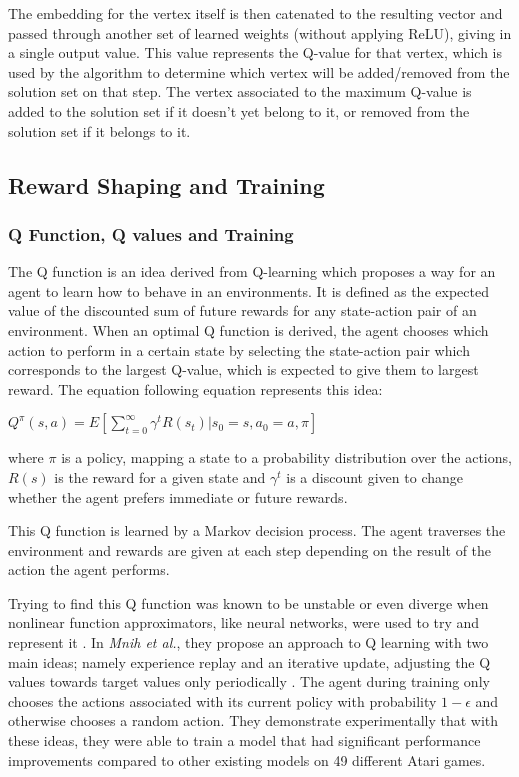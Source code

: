 \documentclass{article}
\begin{document}
The embedding for the vertex itself is then catenated to the resulting vector and passed through another set of learned weights (without applying ReLU), giving in a single output value. This value represents the Q-value for that vertex, which is used by the algorithm to determine which vertex will be added/removed from the solution set on that step. The vertex associated to the maximum Q-value is added to the solution set if it doesn't yet belong to it, or removed from the solution set if it belongs to it.

\subsection{Reward Shaping and Training}

\subsubsection{Q Function, Q values and Training}

The Q function is an idea derived from Q-learning \cite{qlearning} which proposes a way for an agent to learn how to behave in an environments. It is defined as the expected value of the discounted sum of future rewards for any state-action pair of an environment. When an optimal Q function is derived, the agent chooses which action to perform in a certain state by selecting the state-action pair which corresponds to the largest Q-value, which is expected to give them to largest reward. The equation following equation represents this idea:
 
$Q^\pi(s, a) = E[\sum_{t=0}^{\infty} \gamma^t R(s_t) | s_0 = s, a_0 = a, \pi]$

where $\pi$ is a policy, mapping a state to a probability distribution over the actions, $R(s)$ is the reward for a given state and $\gamma^t$ is a discount given to change whether the agent prefers immediate or future rewards.

This Q function is learned by a Markov decision process. The agent traverses the environment and rewards are given at each step depending on the result of the action the agent performs.

Trying to find this Q function was known to be unstable or even diverge when nonlinear function approximators, like neural networks, were used to try and represent it \cite{td-func-approx}. In \textit{Mnih et al.}, they propose an approach to Q learning with two main ideas; namely experience replay and an iterative update, adjusting the Q values towards target values only periodically \cite{deepmind_2015}. The agent during training only chooses the actions associated with its current policy with probability $1 - \epsilon$ and otherwise chooses a random action. They demonstrate experimentally that with these ideas, they were able to train a model that had significant performance improvements compared to other existing models on 49 different Atari games.
\end{document}

